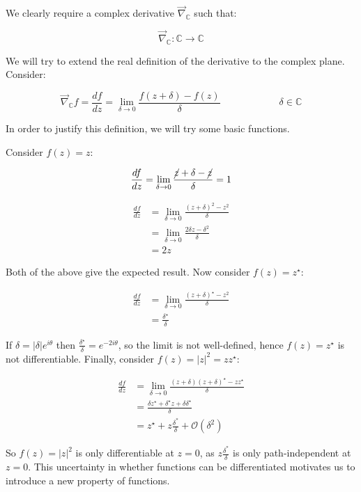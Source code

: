 \documentclass{../../physics_notes}
\begin{document}
We clearly require a complex derivative $\vec{\nabla}_{\mathbb{C}}$ such that:

\[ \vec{\nabla}_{\mathbb{C}}: \mathbb{C} \longrightarrow \mathbb{C} \]

We will try to extend the real definition of the derivative to the complex plane. Consider:

\[ \vec{\nabla}_{\mathbb{C}} f = \frac{df}{dz} = \lim_{\delta\to 0} \frac{f(z+\delta) - f(z)}{\delta} \hspace{1in} \delta \in \mathbb{C}\]

In order to justify this definition, we will try some basic functions. 

Consider $f(z) = z$:

\begin{align*}
\frac{df}{dz} = \lim_{\delta\to 0} \frac{\cancel{z}+\delta - \cancel{z}}{\delta} = 1
\end{align*}

 \begin{align*}
\frac{df}{dz} &= \lim_{\delta\to 0} \frac{(z+\delta)^2 - z^2}{\delta} \\
&= \lim_{\delta\to 0} \frac{2\delta z - \delta^2}{\delta} \\
&= 2z
\end{align*}

Both of the above give the expected result. Now consider $f(z) = z^\star$:

\begin{align*}
\frac{df}{dz} &= \lim_{\delta\to 0} \frac{(z+\delta)^\star - z^2}{\delta} \\
&= \frac{\delta^\star}{\delta} 
\end{align*}

If $\delta = |\delta|e^{i\theta}$ then $\frac{\delta^\star}{\delta} = e^{-2i\theta}$, so the limit is not well-defined, hence $f(z) = z^\star$ is not differentiable. Finally, consider $f(z) = |z|^2 = z z^\star$:

\begin{align*}
\frac{df}{dz} &= \lim_{\delta\to 0} \frac{(z+\delta) (z+\delta)^\star - z z^\star}{\delta} \\
&= \frac{\delta z^\star + \delta^\star z + \delta \delta^\star}{\delta} \\
&= z^\star + z\frac{\delta^*}{\delta} + \mathcal{O}(\delta^2)
\end{align*}

So $f(z) = |z|^2$ is only differentiable at $z=0$, as $z\frac{\delta^*}{\delta}$ is only path-independent at $z=0$. This uncertainty in whether functions can be differentiated motivates us to introduce a new property of functions.
\end{document}
